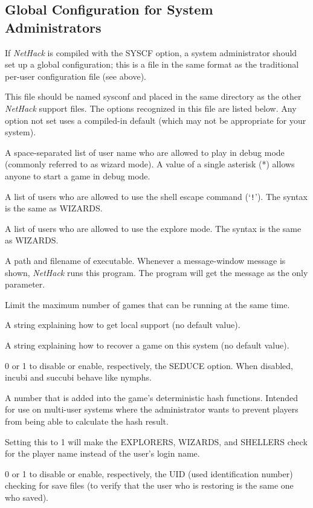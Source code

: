 \documentclass[titlepage]{article}
\begin{document}
\subsection*{Global Configuration for System Administrators}

If \textit{NetHack} is compiled with the SYSCF option, a system administrator
should set up a global configuration; this is a file in the
same format as the traditional per-user configuration file (see above).

This file should be named sysconf and placed in the same directory as
the other \textit{NetHack} support files.
The options recognized in this file are listed below. Any option not
set uses a compiled-in default (which may not be appropriate for your
system).

\begin{description}[font=\mdseries\itshape]
\item[WIZARDS]
A space-separated list of user name who are allowed to
play in debug mode (commonly referred to as wizard mode).
A value of a single
asterisk (*) allows anyone to start a game in debug mode.
\item[SHELLERS]
A list of users who are allowed to use the shell escape command (`\texttt{!}').
The syntax is the same as WIZARDS.
\item[EXPLORERS]
A list of users who are allowed to use the explore mode.
The syntax is the same as WIZARDS.
\item[MSGHANDLER]
A path and filename of executable.  Whenever a message-window
message is shown, \textit{NetHack} runs this program.  The program will get
the message as the only parameter.
\item[MAXPLAYERS]
Limit the maximum number of games that can be running at the same time.
\item[SUPPORT]
A string explaining how to get local support (no default value).
\item[RECOVER]
A string explaining how to recover a game on this system (no default value).
\item[SEDUCE]
0 or 1 to disable or enable, respectively, the SEDUCE option.
When disabled, incubi and succubi behave like nymphs.
\item[SERVERSEED]
A number that is added into the game's deterministic hash functions. Intended
for use on multi-user systems where the administrator wants to prevent players
from being able to calculate the hash result.
\item[CHECK\textunderscore PLNAME]
Setting this to 1 will make the EXPLORERS, WIZARDS, and SHELLERS check
for the player name instead of the user's login name.
\item[CHECK\textunderscore SAVE\textunderscore UID]
0 or 1 to disable or enable, respectively, the UID
(used identification number) checking for save files (to verify that the
user who is restoring is the same one who saved).
\end{description}
\end{document}
